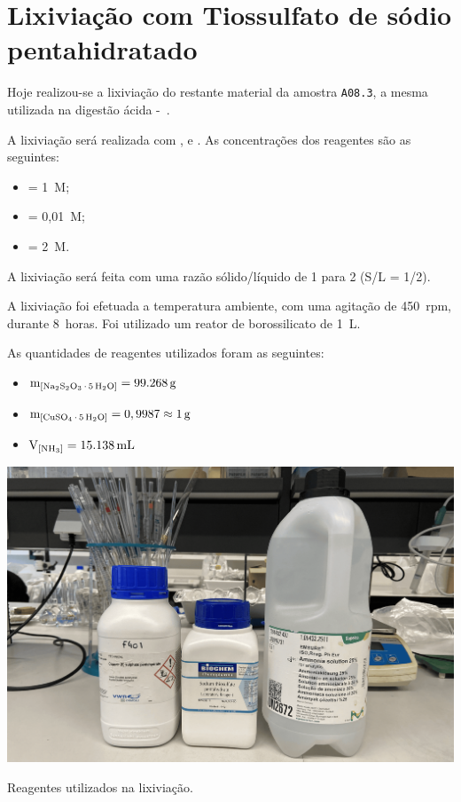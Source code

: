 \pagestyle{fancy}

\section*{Lixiviação com Tiossulfato de sódio pentahidratado}


Hoje realizou-se a lixiviação do restante material da amostra \texttt{A08.3}, a mesma utilizada na digestão ácida -~.

A lixiviação será realizada com \TSP{}, \SCP{} e \AMO{}.
As concentrações dos reagentes são as seguintes:
\begin{itemize}
    \item \tsp{} = 1~M\@;
    \item \scp{} = 0,01~M\@;
    \item \amo{} = 2~M\@.
\end{itemize}

A lixiviação será feita com uma razão sólido/líquido de 1 para 2 (S/L = 1/2).

A lixiviação foi efetuada a temperatura ambiente, com uma agitação de 450~rpm, durante 8~horas.
Foi utilizado um reator de borossilicato de 1~L\@.

As quantidades de reagentes utilizados foram as seguintes:
\begin{itemize}
    \item $\mathrm{m}_{\left[ \tsp \right]} = \SI{99,268}{g}$
    \item $\mathrm{m}_{\left[ \scp \right]} = 0,9987 \approx \SI{1}{g}$
    \item $\mathrm{V}_{\left[ \amo \right]} = \SI{15,138}{mL}$
\end{itemize}

\begin{marginfigure}[-4\baselineskip]
    \centering
    \includegraphics[width=\linewidth]{figures/reagentes-lixiviação 1}
    \caption{Reagentes utilizados na lixiviação.}
    \label{fig:reagentes-lixiviacao-1}
\end{marginfigure}

